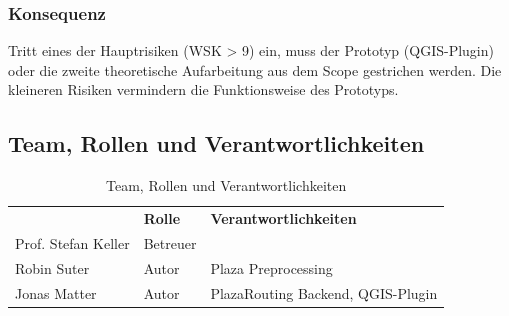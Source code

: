 \subsubsection{Konsequenz}
\label{Risiken:Konsequenz}
Tritt eines der Hauptrisiken (WSK > 9) ein, muss der Prototyp (QGIS-Plugin) oder die zweite theoretische Aufarbeitung aus dem Scope gestrichen werden. Die kleineren Risiken vermindern die Funktionsweise des Prototyps.

\subsection{Team, Rollen und Verantwortlichkeiten}
\label{sub:Team, Rollen und Verantwortlichkeiten}

\begin{table}[H]
    \centering
    \caption{Team, Rollen und Verantwortlichkeiten}
    \label{table: Team, Rollen und Verantwortlichkeiten}
    \begin{tabular}{lll}
        & \textbf{Rolle} & \textbf{Verantwortlichkeiten}    \\
        Prof. Stefan Keller  &        Betreuer                   &    \\
        Robin Suter          &        Autor                      & Plaza Preprocessing \\
        Jonas Matter         &        Autor                      & PlazaRouting Backend, QGIS-Plugin
    \end{tabular}
\end{table}
